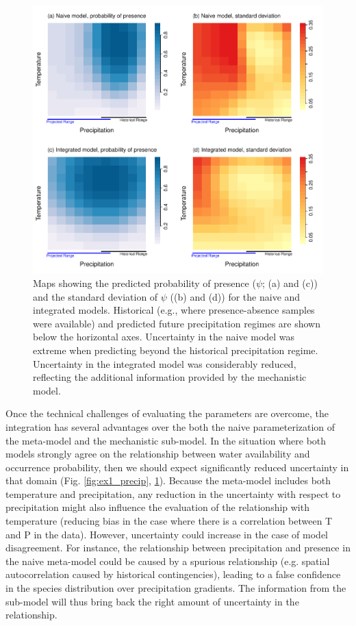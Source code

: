 \begin{figure}[tb]
	\includegraphics[width=5.25in]{ex1_map.pdf}
	\caption{Maps showing the predicted probability of presence (\(\psi\); (a) and (c)) and the standard deviation of \(\psi\) ((b) and (d)) for the naive and integrated models.
	Historical (e.g., where presence-absence samples were available) and predicted future precipitation regimes are shown below the horizontal axes.
	Uncertainty in the naive model was extreme when predicting beyond the historical precipitation regime.
	Uncertainty in the integrated model was considerably reduced, reflecting the additional information provided by the mechanistic model.}
	\label{fig:ex1_map}
\end{figure}
%

Once the technical challenges of evaluating the parameters are overcome, the integration has several advantages over the both the naive parameterization of the meta-model and the mechanistic sub-model. 
In the situation where both models strongly agree on the relationship between water availability and occurrence probability, then we should expect significantly reduced uncertainty in that domain (Fig. \ref{fig:ex1_precip}, \ref{fig:ex1_map}).
Because the meta-model includes both temperature and precipitation, any reduction in the uncertainty with respect to precipitation might also influence the evaluation of the relationship with temperature (reducing bias in the case where there is a correlation between T and P in the data). 
However, uncertainty could increase in the case of model disagreement.
For instance, the relationship between precipitation and presence in the naive meta-model could be caused by a spurious relationship (e.g. spatial autocorrelation caused by historical contingencies), leading to a false confidence in the species distribution over precipitation gradients. 
The information from the sub-model will thus bring back the right amount of uncertainty in the relationship.

